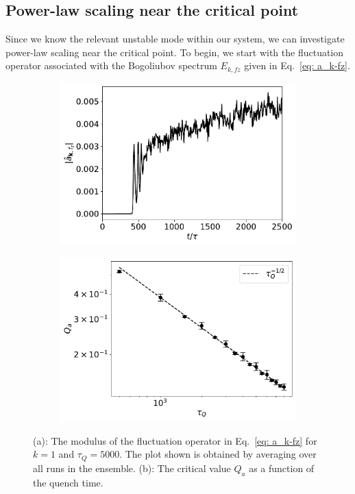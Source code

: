 \subsection{Power-law scaling near the critical point}
Since we know the relevant unstable mode within our system, we can investigate
power-law scaling near the critical point.
To begin, we start with the fluctuation operator associated with the
Bogoliubov spectrum \(E_{k, fz}\) given in Eq.~\eqref{eq: a_k-fz}.
\begin{figure}[tb]
    \centering
    \begin{subfigure}{0.45\textwidth}
        \includegraphics[width=\textwidth]
        {gfx/ch-spin1/1d_BA-FM_5000_fluctuation_diff.pdf}
        \caption{\label{fig: fluctuation-diff}}
    \end{subfigure}
    \begin{subfigure}{0.45\textwidth}
        \includegraphics[width=\textwidth]{gfx/ch-spin1/BA-FM_Qa_scaling.pdf}
        \caption{\label{fig: Q_a-scaling}}
    \end{subfigure}
    \caption[Growth of the fluctuation operator]
    {(a): The modulus of the fluctuation operator in
        Eq.~\eqref{eq: a_k-fz} for \(k=1\) and
        \(\tau_Q=5000\).
        The plot shown is obtained by averaging over all runs in the ensemble.
        (b): The critical value \(Q_a\) as a function of the quench time.
    }
\end{figure}
